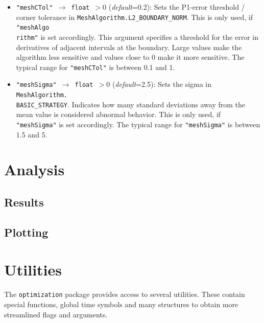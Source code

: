 \documentclass[12pt]{article}
\begin{document}
\begin{mdframed}[backgroundcolor=gray!10, roundcorner=10pt,
	linewidth=1pt]
\begin{itemize}
	\label{flag:meshCTol}
	\item \texttt{"meshCTol" $\rightarrow$ float $> 0$} (\emph{default}=0.2): Sets the P1-error threshold / corner tolerance in \texttt{MeshAlgorithm.L2\_BOUNDARY\_NORM}. This is only used, if \texttt{"meshAlgo\\rithm"} is set accordingly. This argument specifies a threshold for the error in derivatives of adjacent intervals at the boundary. Large values make the algorithm less sensitive and values close to 0 make it more sensitive.
	The typical range for \texttt{"meshCTol"} is between 0.1 and 1.
	
	\label{flag:meshSigma}
	\item \texttt{"meshSigma" $\rightarrow$ float $> 0$} (\emph{default}=2.5): Sets the sigma in \texttt{MeshAlgorithm.\\BASIC\_STRATEGY}. Indicates how many standard deviations away from the mean value is considered abnormal behavior. This is only used, if \texttt{"meshSigma"} is set accordingly.
	The typical range for \texttt{"meshSigma"} is between 1.5 and 5.

\end{itemize}
		
\end{mdframed}

\section{Analysis}
\label{c:Analysis}

\subsection{Results}
\label{c:Results}

\subsection{Plotting}
\label{c:Plotting}

\section{Utilities}
The \texttt{optimization} package provides access to several utilities.
These contain special functions, global time symbols and many structures to
obtain more streamlined flags and arguments.
\end{document}
